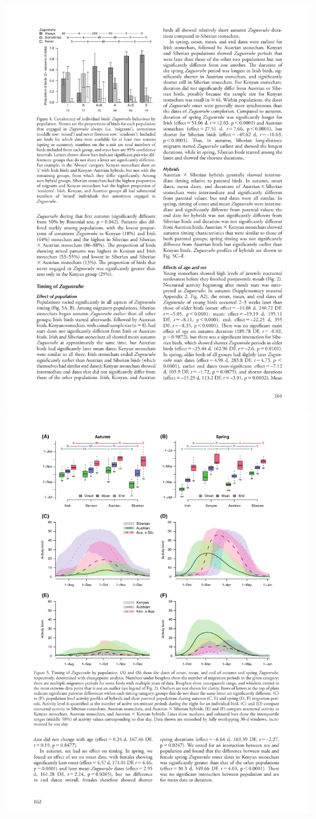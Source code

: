 \documentclass[a4paper, twoside]{templates/ociamthesis}
\begin{document}
\includegraphics[width=1\linewidth]{pdf_chapters/zug/zug_crop_Part07}
\includegraphics[width=1\linewidth]{pdf_chapters/zug/zug_crop_Part08}
\end{document}
